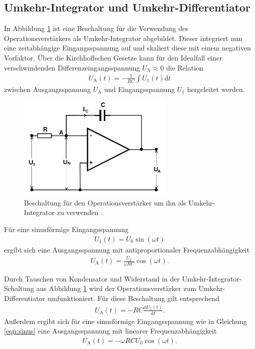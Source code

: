 \subsection{Umkehr-Integrator und Umkehr-Differentiator}

In Abbildung \ref{fig:integrator} ist eine Beschaltung für die Verwendung des Operationsverstärkers
als Umkehr-Integrator abgebildet. Dieser integriert nun eine zeitabhängige Eingangsspannung auf
und skaliert diese mit einem negativen Vorfaktor.
Über die Kirchhoffschen Gesetze kann für den Idealfall einer verschwindenden Differenzeingangsspannung
$U_\text{N} \approx 0$ die Relation
\begin{align}
  U_\text{A}(t) = - \frac1{R C} \int U_1(t) \mathrm{d}t
\end{align}
zwischen Ausgangsspannung $U_\text{A}$ und Eingangsspannung $U_1$ hergeleitet werden.

\begin{figure}
  \centering
  \includegraphics[height=5cm]{ImmerDieseNorweger/integrator.png}
  \caption{Beschaltung für den Operationsverstärker um ihn als Umkehr-Integrator zu verwenden \cite{anleitung}.}
  \label{fig:integrator}
\end{figure}

Für eine sinusförmige Eingangsspannung
\begin{align}
  U_1(t) = U_0 \sin \left( \omega t \right)
  \label{eqn:sinus}
\end{align}
ergibt sich eine Ausgangsspannung mit antiproportionaler Frequenzabhängigkeit
\begin{align}
  U_\text{A}(t) = \frac{U_0}{\omega R C} \cos \left( \omega t \right).
  \label{eqn:int_aus}
\end{align}

Durch Tauschen von Kondensator und Widerstand in der Umkehr-Integrator-Schaltung aus Abbildung \ref{fig:integrator}
wird der Operationsverstärker zum Umkehr-Differentiator umfunktioniert.
Für diese Beschaltung gilt entsprechend
\begin{align}
  U_\text{A}(t) = - RC \frac{\mathrm{d} U_1(t)}{\mathrm{d}t}.
\end{align}
Außerdem ergibt sich für eine sinusförmige Eingangsspannung wie in Gleichung \eqref{eqn:sinus}
eine Ausgangsspannung mit linearer Frequenzabhängigkeit
\begin{align}
  U_\text{A}(t) = - \omega R C U_0 \cos \left( \omega t \right).
  \label{eqn:diff_aus}
\end{align}


